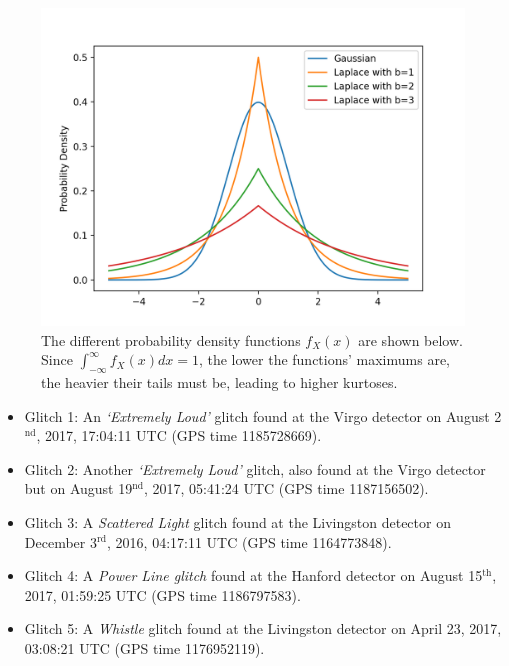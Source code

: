 \documentclass[preprint,
letterpaper,
 amsmath,amssymb,
 aps,
]{revtex4-2}
\begin{document}
\begin{figure}[t]
\caption{The different probability density functions $f_X(x)$ are shown below. Since $\int_{-\infty}^\infty f_X(x)dx = 1$, the lower the  functions' maximums are, the heavier their tails must be, leading to higher kurtoses.}
\includegraphics[scale = .54]{pdf graphs.png}
\centering
\end{figure}


\begin{itemize}
\item Glitch 1: An \textit{`Extremely Loud'} glitch found at the Virgo detector on August 2$^{\text{nd}}$, 2017, 17:04:11 UTC (GPS time 1185728669).

\item Glitch 2: Another \textit{`Extremely Loud'} glitch, also found at the Virgo detector but on August 19$^{\text{nd}}$, 2017, 05:41:24 UTC (GPS time 1187156502).

\item Glitch 3: A \textit{Scattered Light} glitch found at the Livingston detector on December 3$^{\text{rd}}$, 2016, 04:17:11 UTC (GPS time 1164773848).

\item Glitch 4: A \textit{Power Line glitch} found at the Hanford detector on August 15$^{\text{th}}$, 2017, 01:59:25 UTC (GPS time 1186797583).

\item Glitch 5: A \textit{Whistle} glitch found at the Livingston detector on April 23, 2017, 03:08:21 UTC (GPS time 1176952119).
\end{itemize}
\end{document}
